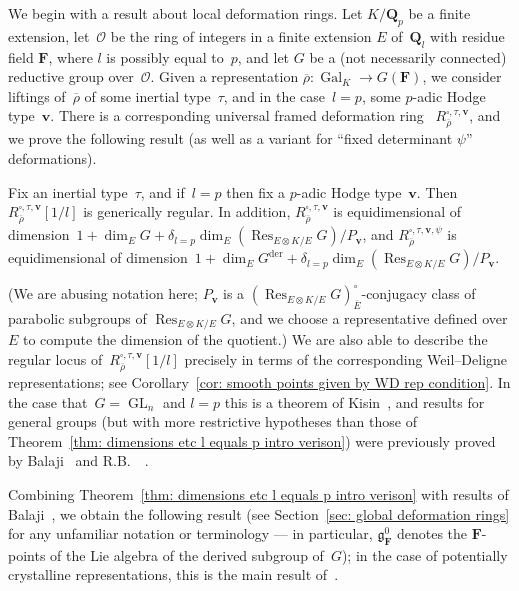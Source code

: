 \documentclass{amsart}
\renewcommand{\mathbb}{\mathbf}
\renewcommand{\ell}{l}
\newcommand\Gder{G^{\mathrm{der}}}
\def\fg{\mathfrak{g}}
\theoremstyle{definition}
\theoremstyle{remark}
\newcommand{\F}{\FF}
\newcommand{\Q}{\QQ}
\newcommand{\FF}{{\mathbb F}}
\newcommand{\QQ}{{\mathbb Q}}
\newcommand{\cO}{{\mathcal O}}
\newcommand{\Ql}{\Q_{\ell}}
\newcommand{\Qp}{\Q_p}
\DeclareMathOperator{\Gal}{Gal}
\DeclareMathOperator{\GL}{GL}
\newcommand{\rhobar}{\overline{\rho}}
\newcommand{\Res}{\operatorname{Res}}
\begin{document}
We begin with a result about local deformation rings. Let $K/\Qp$ be
a finite extension, let~$\cO$ be the ring of integers in a finite
extension $E$ of~$\Ql$ with residue field $\F$, where $l$ is possibly equal to~$p$, and let $G$ be
a (not necessarily connected) reductive group over~$\cO$. Given a
representation $\rhobar:\Gal_K\to G(\F)$, we consider liftings
of~$\rhobar$ of some inertial type~$\tau$, and in the case~$l=p$, some
$p$-adic Hodge type~$\mathbf{v}$. There is a corresponding universal
framed deformation ring~ $R_{\rhobar}^{\square,\tau,\mathbf{v}}$, and
we prove the following result (as well as a variant for ``fixed
determinant $\psi$'' deformations).

\begin{ithm} \label{thm:
    dimensions etc l equals p intro verison}
  Fix an inertial type~$\tau$, and if~$l=p$ then fix a $p$-adic Hodge
  type~$\mathbf{v}$. Then $R_{\rhobar}^{\square,\tau,\mathbf{v}}[1/l]$
  is generically regular. In addition, $R_{\rhobar}^{\square,\tau,\mathbf{v}}$ is equidimensional of
  dimension~$1+\dim_E G+\delta_{l=p}\dim_E(\Res_{E\otimes K/E}G)/P_{\mathbf{v}}$, and $R_{\rhobar}^{\square,\tau,\mathbf{v},\psi}$ is equidimensional of
  dimension~$1+\dim_E \Gder + \delta_{l=p}\dim_E(\Res_{E\otimes K/E}G)/P_{\mathbf{v}}$.
\end{ithm}
(We are abusing notation here; $P_{\mathbf{v}}$ is a $(\Res_{E\otimes
  K/E}G)_{\overline E}^\circ$-conjugacy class of parabolic subgroups
of $\Res_{E\otimes K/E}G$, and we choose a representative defined over
$E$ to compute the dimension of the quotient.) We are also able to
describe the regular locus
of~$R_{\rhobar}^{\square,\tau,\mathbf{v}}[1/l]$ precisely in terms of
the corresponding Weil--Deligne representations; see
Corollary~\ref{cor: smooth points given by WD rep condition}. In the
case that~$G=\GL_n$ and $l=p$ this is a theorem of
Kisin~\cite{MR2373358}, and results for general groups (but with more
restrictive hypotheses than those of Theorem~\ref{thm:
    dimensions etc l equals p intro verison}) were previously proved
  by Balaji~\cite{MR3152673} and R.B.\ ~\cite{2014arXiv1403.1411B}.



Combining Theorem~\ref{thm:
    dimensions etc l equals p intro verison} with results of Balaji~\cite{MR3152673}, we obtain the following result (see Section~\ref{sec: global deformation
  rings} for any unfamiliar notation or terminology --- in particular,
$\fg_\F^0$ denotes the $\F$-points of the Lie algebra of the derived
subgroup of~$G$); in the case of
potentially crystalline representations, this is the main result of~\cite{MR3152673}.
\end{document}
